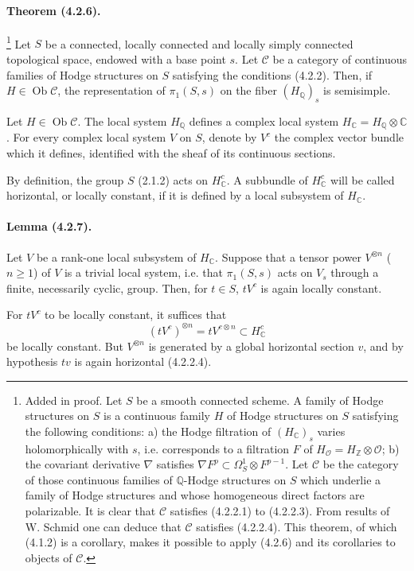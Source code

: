 \documentclass[10pt]{article}
\newcommand{\C}{\mathbb C}
\newcommand{\Q}{\mathbb Q}
\newcommand{\Z}{\mathbb Z}
\providecommand{\cO}{\mathcal O}
\providecommand{\cO}{\mathcal O}
\newcommand{\Ob}{\operatorname{Ob}}
\begin{document}
\paragraph{Theorem (4.2.6).}\footnote{Added in proof. Let $S$ be a smooth connected scheme. A family of Hodge structures on $S$ is a continuous family $H$ of Hodge structures on $S$ satisfying the following conditions: a) the Hodge filtration of $(H_\C)_s$ varies holomorphically with $s$, i.e. corresponds to a filtration $F$ of $H_\cO=H_\Z\otimes\cO$; b) the covariant derivative $\nabla$ satisfies $\nabla F^p\subset\Omega_S^1\otimes F^{p-1}$. Let $\mathcal C$ be the category of those continuous families of $\Q$-Hodge structures on $S$ which underlie a family of Hodge structures and whose homogeneous direct factors are polarizable. It is clear that $\mathcal C$ satisfies (4.2.2.1) to (4.2.2.3). From results of W. Schmid one can deduce that $\mathcal C$ satisfies (4.2.2.4). This theorem, of which (4.1.2) is a corollary, makes it possible to apply (4.2.6) and its corollaries to objects of $\mathcal C$.} Let $S$ be a connected, locally connected and locally simply connected topological space, endowed with a base point $s$. Let $\mathcal C$ be a category of continuous families of Hodge structures on $S$ satisfying the conditions (4.2.2). Then, if $H\in\Ob\mathcal C$, the representation of $\pi_1(S,s)$ on the fiber $(H_\Q)_s$ is semisimple.

Let $H\in\Ob\mathcal C$. The local system $H_\Q$ defines a complex local system $H_\C=H_\Q\otimes\C$. For every complex local system $V$ on $S$, denote by $V^c$ the complex vector bundle which it defines, identified with the sheaf of its continuous sections.

By definition, the group $S$ (2.1.2) acts on $H_\C^c$. A subbundle of $H_\C^c$ will be called horizontal, or locally constant, if it is defined by a local subsystem of $H_\C$.

\paragraph{Lemma (4.2.7).} Let $V$ be a rank-one local subsystem of $H_\C$. Suppose that a tensor power $V^{\otimes n}$ ($n\ge1$) of $V$ is a trivial local system, i.e. that $\pi_1(S,s)$ acts on $V_s$ through a finite, necessarily cyclic, group. Then, for $t\in S$, $tV^c$ is again locally constant.

For $tV^c$ to be locally constant, it suffices that
\[
(tV^c)^{\otimes n}=tV^{c\otimes n}\subset H_\C^c
\]
be locally constant. But $V^{\otimes n}$ is generated by a global horizontal section $v$, and by hypothesis $tv$ is again horizontal (4.2.2.4).
\end{document}
